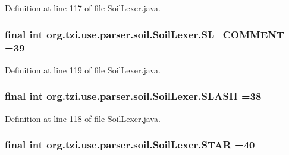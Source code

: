 Definition at line 117 of file Soil\-Lexer.\-java.

\hypertarget{classorg_1_1tzi_1_1use_1_1parser_1_1soil_1_1_soil_lexer_a7f583fdc4256b7a9599f6d294ab2d260}{
\subsubsection[{S\-L\-\_\-\-C\-O\-M\-M\-E\-N\-T}]{\setlength{\rightskip}{0pt plus 5cm}final int org.\-tzi.\-use.\-parser.\-soil.\-Soil\-Lexer.\-S\-L\-\_\-\-C\-O\-M\-M\-E\-N\-T =39\hspace{0.3cm}{\ttfamily [static]}}}\label{classorg_1_1tzi_1_1use_1_1parser_1_1soil_1_1_soil_lexer_a7f583fdc4256b7a9599f6d294ab2d260}


Definition at line 119 of file Soil\-Lexer.\-java.

\hypertarget{classorg_1_1tzi_1_1use_1_1parser_1_1soil_1_1_soil_lexer_aaa2ca1c8eac8b3f52ea2a1fdf4302e5e}{
\subsubsection[{S\-L\-A\-S\-H}]{\setlength{\rightskip}{0pt plus 5cm}final int org.\-tzi.\-use.\-parser.\-soil.\-Soil\-Lexer.\-S\-L\-A\-S\-H =38\hspace{0.3cm}{\ttfamily [static]}}}\label{classorg_1_1tzi_1_1use_1_1parser_1_1soil_1_1_soil_lexer_aaa2ca1c8eac8b3f52ea2a1fdf4302e5e}


Definition at line 118 of file Soil\-Lexer.\-java.

\hypertarget{classorg_1_1tzi_1_1use_1_1parser_1_1soil_1_1_soil_lexer_ac5408de366bc765f3269e7cc47d607e0}{
\subsubsection[{S\-T\-A\-R}]{\setlength{\rightskip}{0pt plus 5cm}final int org.\-tzi.\-use.\-parser.\-soil.\-Soil\-Lexer.\-S\-T\-A\-R =40\hspace{0.3cm}{\ttfamily [static]}}}\label{classorg_1_1tzi_1_1use_1_1parser_1_1soil_1_1_soil_lexer_ac5408de366bc765f3269e7cc47d607e0}


